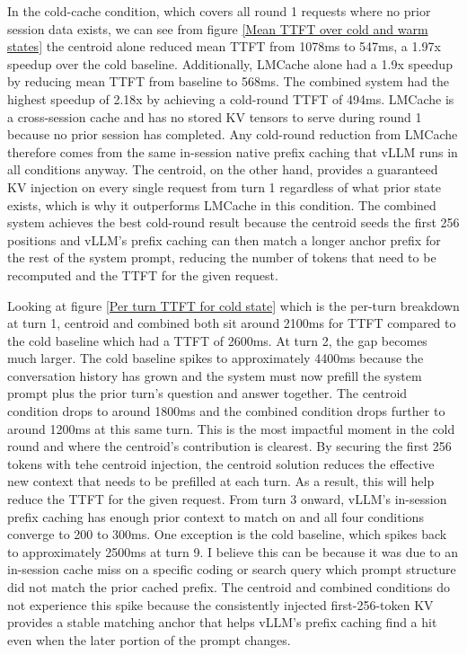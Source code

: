 \documentclass[letterpaper,twocolumn,10pt]{article}
\begin{document}
In the cold-cache condition, which covers all round 1 requests where no prior session data exists, we can see from figure \ref{Mean TTFT over cold and warm states} the centroid alone reduced mean TTFT from 1078ms to 547ms, a 1.97x speedup over the cold baseline. Additionally, LMCache alone had a 1.9x speedup by reducing mean TTFT from baseline to 568ms. The combined system had the highest speedup of 2.18x by achieving a cold-round TTFT of 494ms. LMCache is a cross-session cache and has no stored KV tensors to serve during round 1 because no prior session has completed. Any cold-round reduction from LMCache therefore comes from the same in-session native prefix caching that vLLM runs in all conditions anyway. The centroid, on the other hand, provides a guaranteed KV injection on every single request from turn 1 regardless of what prior state exists, which is why it outperforms LMCache in this condition. The combined system achieves the best cold-round result because the centroid seeds the first 256 positions and vLLM's prefix caching can then match a longer anchor prefix for the rest of the system prompt, reducing the number of tokens that need to be recomputed and the TTFT for the given request.

Looking at figure \ref{Per turn TTFT for cold state} which is the per-turn breakdown at turn 1, centroid and combined both sit around 2100ms for TTFT compared to the cold baseline which had a TTFT of 2600ms. At turn 2, the gap becomes much larger. The cold baseline spikes to approximately 4400ms because the conversation history has grown and the system must now prefill the system prompt plus the prior turn's question and answer together. The centroid condition drops to around 1800ms and the combined condition drops further to around 1200ms at this same turn. This is the most impactful moment in the cold round and where the centroid's contribution is clearest. By securing the first 256 tokens with tehe centroid injection, the centroid solution reduces the effective new context that needs to be prefilled at each turn. As a result, this will help reduce the TTFT for the given request. From turn 3 onward, vLLM's in-session prefix caching has enough prior context to match on and all four conditions converge to 200 to 300ms. One exception is the cold baseline, which spikes back to approximately 2500ms at turn 9. I believe this can be because it was due to an in-session cache miss on a specific coding or search query which prompt structure did not match the prior cached prefix. The centroid and combined conditions do not experience this spike because the consistently injected first-256-token KV provides a stable matching anchor that helps vLLM's prefix caching find a hit even when the later portion of the prompt changes.
\end{document}
